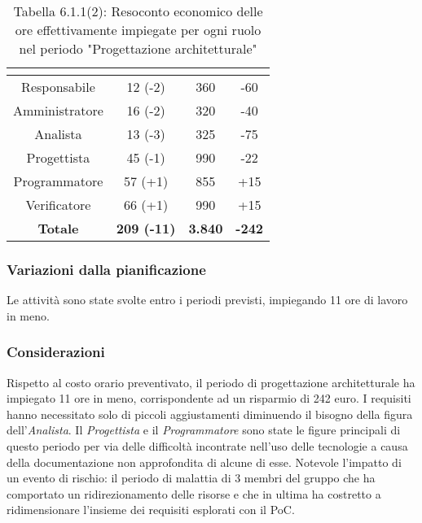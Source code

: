 \renewcommand{\arraystretch}{1.4}
\begin{table}[H]
\begin{center}
\begin{tabular}{|c|c|c|c|}
\hline
\rowcolor{title_row}
\textbf{\color{title_text}{Ruolo}}  & \textbf{\color{title_text}{Ore}} & \textbf{\color{title_text}{Costo in \euro}} & \textbf{\color{title_text}{Differenza al preventivo in \euro}} \\ \hline
Responsabile    & 12 (-2) & 360 & -60 \\ \hline
Amministratore  & 16 (-2) & 320 &  -40 \\ \hline
Analista        & 13 (-3) & 325 & -75 \\ \hline
Progettista     & 45 (-1) & 990 & -22 \\ \hline
Programmatore   & 57 (+1) & 855 & +15  \\ \hline
Verificatore    & 66 (+1) & 990 & +15  \\ \hline
\textbf{Totale} & \textbf{209 (-11)}    & \textbf{3.840} & \textbf{-242} \\ \hline
\end{tabular}
\caption{Tabella 6.1.1(2): Resoconto economico delle ore effettivamente impiegate per ogni ruolo nel periodo "Progettazione architetturale"\label{}}
\end{center}
\end{table}
\renewcommand{\arraystretch}{1}


\subsubsection{Variazioni dalla pianificazione}
Le attività sono state svolte entro i periodi previsti, impiegando 11 ore di lavoro in meno.

\subsubsection{Considerazioni}
Rispetto al costo orario preventivato, il periodo di progettazione architetturale ha impiegato 11 ore in meno, corrispondente ad un risparmio di 242 euro.
I requisiti hanno necessitato solo di piccoli aggiustamenti diminuendo il bisogno della figura dell'\emph{Analista}. Il \emph{Progettista} e il \emph{Programmatore} sono state le figure principali di questo periodo per via delle difficoltà incontrate nell'uso delle tecnologie a causa della documentazione non approfondita di alcune di esse.
Notevole l'impatto di un evento di rischio: il periodo di malattia di 3 membri del gruppo che ha comportato un ridirezionamento delle risorse e che in ultima ha costretto a ridimensionare l'insieme dei requisiti esplorati con il PoC.
\pagebreak
